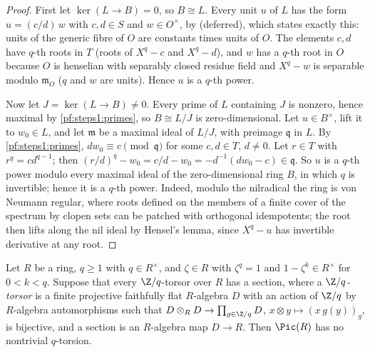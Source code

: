 \begin{proof}
First let $\ker(L\to B)=0$, so $B\cong L$. Every unit $u$ of $L$ has the form $u=(c/d)\,w$ with $c,d\in S$ and
$w\in O^\times$, by  (deferred), which
states exactly this: units of the generic fibre of $O$ are constants times units of $O$. The elements $c,d$ have
$q$-th roots in $T$ (roots of $X^q-c$ and $X^q-d$), and $w$ has a $q$-th root in $O$ because $O$ is henselian with
separably closed residue field and $X^q-w$ is separable modulo $\mathfrak m_O$ ($q$ and $w$ are units). Hence $u$ is a
$q$-th power.

Now let $J=\ker(L\to B)\ne0$. Every prime of $L$ containing $J$ is nonzero, hence maximal by
\cref{pf:steps1:primes}, so $B\cong L/J$ is zero-dimensional. Let $u\in B^\times$, lift it to $w_0\in L$, and let
$\mathfrak m$ be a maximal ideal of $L/J$, with preimage $\mathfrak q$ in $L$. By \cref{pf:steps1:primes},
$dw_0\equiv c\pmod{\mathfrak q}$ for some $c,d\in T$, $d\ne0$. Let $r\in T$ with $r^q=cd^{q-1}$; then
$(r/d)^q-w_0=c/d-w_0=-d^{-1}(dw_0-c)\in\mathfrak q$. So $u$ is a $q$-th power modulo every maximal ideal of the
zero-dimensional ring $B$, in which $q$ is invertible; hence it is a $q$-th power. Indeed, modulo the nilradical the
ring is von Neumann regular, where roots defined on the members of a finite cover of the spectrum by clopen sets can
be patched with orthogonal idempotents; the root then lifts along the nil ideal by Hensel's lemma, since $X^q-u$ has
invertible derivative at any root.
\end{proof}

\begin{lemma}\label{pf:steps1:kummer}
Let $R$ be a ring, $q\ge1$ with $q\in R^\times$, and $\zeta\in R$ with $\zeta^q=1$ and $1-\zeta^k\in R^\times$ for
$0<k<q$. Suppose that every $\Z/q$-torsor over $R$ has a section, where a \emph{$\Z/q$-torsor} is a finite projective
faithfully flat $R$-algebra $D$ with an action of $\Z/q$ by $R$-algebra automorphisms such that
$D\otimes_RD\to\prod_{g\in\Z/q}D$, $x\otimes y\mapsto(x\,g(y))_g$, is bijective, and a section is an $R$-algebra map
$D\to R$. Then $\Pic(R)$ has no nontrivial $q$-torsion.
\end{lemma}

